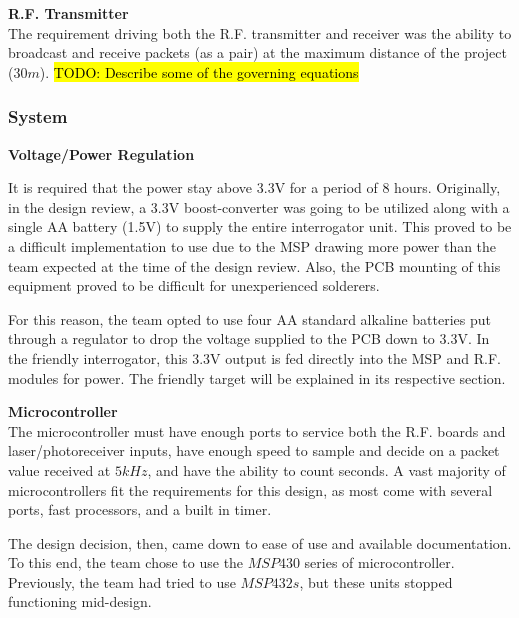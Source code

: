\documentclass[letterpaper,10pt]{article}
\begin{document}
\begin{spacing}{1.15}
\hspace{5mm}\textbf{R.F. Transmitter} \label{section:rf-transmitter-design-procedure} \\
The requirement driving both the R.F. transmitter and receiver was the ability to broadcast and receive packets (as a pair) at the maximum distance of the project ($30m$). 
\hl{TODO: Describe some of the governing equations}


\subsubsection{System}

\hspace{5mm}\textbf{Voltage/Power Regulation} \label{section:interrogator-voltage-regulation-design-procedure}

It is required that the power stay above 3.3V for a period of 8 hours. Originally, in the design review, a 3.3V boost-converter was going to be utilized along with a single AA battery (1.5V) to supply the entire interrogator unit. This proved to be a difficult implementation to use due to the MSP drawing more power than the team expected at the time of the design review. Also, the PCB mounting of this equipment proved to be difficult for unexperienced solderers. 

For this reason, the team opted to use four AA standard alkaline batteries put through a regulator to drop the voltage supplied to the PCB down to 3.3V. In the friendly interrogator, this 3.3V output is fed directly into the MSP and R.F. modules for power. The friendly target will be explained in its respective section. 

\hspace{5mm}\textbf{Microcontroller} \label{section:system-design-procedure}\\

The microcontroller must have enough ports to service both the R.F. boards and laser/photoreceiver inputs, have enough speed to sample and decide on a packet value received at $5kHz$, and have the ability to count seconds. A vast majority of microcontrollers fit the requirements for this design, as most come with several ports, fast processors, and a built in timer.

The design decision, then, came down to ease of use and available documentation. To this end, the team chose to use the $MSP430$ series of microcontroller. Previously, the team had tried to use $MSP432s$, but these units stopped functioning mid-design. 


\end{spacing}
\end{document}
